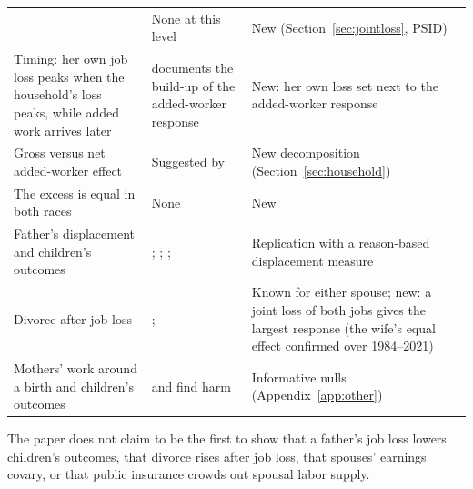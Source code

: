 \begin{table}[!htbp]
\begin{tabular}{p{}p{}p{}}
& None at this level & New (Section~\ref{sec:jointloss}, PSID) \\
\addlinespace
Timing: her own job loss peaks when the household's loss peaks, while added work arrives later & \citet{stephens2002worker}
documents the build-up of the added-worker response & New: her own loss set next to the added-worker response \\
\addlinespace
Gross versus net added-worker effect & Suggested by \citet{kawano2025who} & New decomposition (Section~\ref{sec:household}) \\
\addlinespace
The excess is equal in both races & None & New \\
\addlinespace
Father's displacement and children's outcomes & \citet{oreopoulos2008intergenerational}; \citet{page2009parental};
\citet{kalil2011parental}; \citet{hilger2016parental} & Replication with a reason-based displacement measure \\
\addlinespace
Divorce after job loss & \citet{charles2004job}; \citet{eliason2012lost} & Known for either spouse; new: a joint loss
of both jobs gives the largest response (the wife's equal effect confirmed over 1984--2021) \\
\addlinespace
Mothers' work around a birth and children's outcomes & \citet{herbst2017are} and \citet{willage2022postpartum} find
harm & Informative nulls (Appendix~\ref{app:other}) \\
\bottomrule
\end{tabular}
\end{table}

The paper does not claim to be the first to show that a father's job loss lowers children's outcomes, that divorce
rises after job loss, that spouses' earnings covary, or that public insurance crowds out spousal labor supply.
